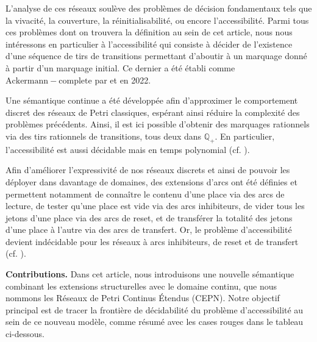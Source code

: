 \documentclass{article}
\theoremstyle{remark}
\theoremstyle{remark}
\begin{document}
L'analyse de ces réseaux soulève des problèmes de décision fondamentaux tels que la vivacité, la couverture, la réinitialisabilité, ou encore l'accessibilité. Parmi tous ces problèmes dont on trouvera la définition au sein de cet article, nous nous intéressons en particulier à l'accessibilité qui consiste à décider de l'existence d'une séquence de tirs de transitions permettant d'aboutir à un marquage donné à partir d'un marquage initial. Ce dernier a été établi comme $\mathrm{Ackermann-complete}$ par \cite{jleroux} et \cite{cerwinski-orlikowski} en 2022.

Une sémantique continue a été développée afin d'approximer le comportement discret des réseaux de Petri classiques, espérant ainsi réduire la complexité des problèmes précédents. Ainsi, il est ici possible d'obtenir des marquages rationnels via des tirs rationnels de transitions, tous deux dans $\mathbb{Q}_+$. En particulier, l'accessibilité est aussi décidable mais en temps polynomial (cf. \cite{fracahaddad}).

Afin d'améliorer l'expressivité de nos réseaux discrets et ainsi de pouvoir les déployer dans davantage de domaines, des extensions d'arcs ont été définies et permettent notamment de connaître le contenu d'une place via des arcs de lecture, de tester qu'une place est vide via des arcs inhibiteurs, de vider tous les jetons d'une place via des arcs de reset, et de transférer la totalité des jetons d'une place à l'autre via des arcs de transfert. Or, le problème d'accessibilité devient indécidable pour les réseaux à arcs inhibiteurs, de reset et de transfert (cf. \cite{dufourd}).

\textbf{Contributions.} Dans cet article, nous introduisons une nouvelle sémantique combinant les extensions structurelles avec le domaine continu, que nous nommons les Réseaux de Petri Continus Étendus (CEPN). Notre objectif principal est de tracer la frontière de décidabilité du problème d'accessibilité au sein de ce nouveau modèle, comme résumé avec les cases rouges dans le tableau ci-dessous.
\end{document}
